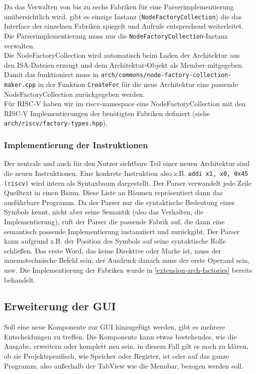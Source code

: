 Da das Verwalten von bis zu sechs Fabriken für eine Parserimplementierung unübersichtlich wird, gibt es einzige Instanz (\texttt{NodeFactoryCollection}) die das Interface der einzelnen Fabriken spiegelt und Aufrufe entsprechend weiterleitet. Die Parserimplementierung muss nur die \texttt{NodeFactoryCollection}-Instanz verwalten.\\
Die NodeFactoryCollection wird automatisch beim Laden der Architektur aus den ISA-Dateien erzeugt und dem Architektur-Objekt als Member mitgegeben. Damit das funktioniert muss in \texttt{arch/commons/node-factory-collection-maker.cpp} in der Funktion \texttt{CreateFor} für die neue Architektur eine passende NodeFactoryCollection zurückgegeben werden.\\
Für RISC-V haben wir im riscv-namespace eine NodeFactoryCollection mit den RISC-V Implementierungen der benötigten Fabriken definiert (siehe \texttt{arch/riscv/factory-types.hpp}).

\subsubsection{Implementierung der Instruktionen}
\label{extension-arch-ast}
Der zentrale und auch für den Nutzer sichtbare Teil einer neuen Architektur sind die neuen Instruktionen. Eine konkrete Instruktion also z.B. \texttt{addi x1, x0, 0x45 (riscv)} wird intern als Syntaxbaum dargestellt. Der Parser verwandelt jede Zeile Quelltext in einen Baum. Diese Liste an Bäumen repräsentiert dann das ausführbare Programm. Da der Parser nur die syntaktische Bedeutung eines Symbols kennt, nicht aber seine Semantik (also das Verhalten, die Implementierung), ruft der Parser die passende Fabrik auf, die dann eine semantisch passende Implementierung instanziiert und zurückgibt. Der Parser kann aufgrund z.B. der Position des Symbols auf seine syntaktische Rolle schließen. Das erste Word, das keine Direktive oder Marke ist, muss der mnemotechnische Befehl sein; der Ausdruck danach muss der erste Operand sein, usw. Die Implementierung der Fabriken wurde in \autoref{extension-arch-factories} bereits behandelt. 

\subsection{Erweiterung der GUI}
Soll eine neue Komponente zur GUI hinzugefügt werden, gibt es mehrere Entscheidungen zu treffen. Die Komponente kann etwas bestehendes, wie die Ausgabe, erweitern oder komplett neu sein. in diesem Fall gilt es noch zu klären, ob sie Projektspezifisch, wie Speicher oder Register, ist oder auf das ganze Programm, also außerhalb der TabView wie die Menubar, bezogen werden soll.

